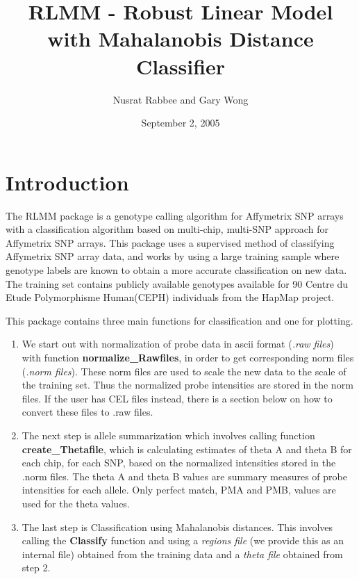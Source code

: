 \documentclass[12pt]{article}
\author{Nusrat Rabbee and Gary Wong}
\begin{document}
\title{RLMM - Robust Linear Model with Mahalanobis Distance Classifier}
\date{September 2, 2005}

\maketitle
\tableofcontents

\section{Introduction}
\noindent  
The RLMM package is a genotype calling algorithm for Affymetrix SNP arrays with a classification algorithm based on multi-chip,
multi-SNP approach for Affymetrix SNP arrays. This package uses a supervised method of classifying Affymetrix SNP array data, 
and works by using a large training sample where genotype labels are known to obtain a more accurate classification on new data.
The training set contains publicly available genotypes available for 90 Centre du Etude Polymorphisme Human(CEPH) individuals from 
the HapMap project. 

\medskip
This package contains three main functions for classification and one for plotting. 

\begin{enumerate}
\item We start out with normalization of probe data in ascii format ({\it .raw files}) with function {\bf normalize\_Rawfiles}, 
in order to get corresponding norm files ({\it .norm files}). These norm files are used to scale the new data to the scale of the training set.
Thus the normalized probe intensities are stored in the norm files. If the user has CEL files instead, there is a section below on how to
convert these files to .raw files. 

\item The next step is allele summarization which involves calling function {\bf create\_Thetafile}, which is calculating estimates of
theta A and theta B for each chip, for each SNP, based on the normalized intensities stored in the .norm files. The theta A and
theta B values are summary measures of probe intensities for each allele. Only perfect match, PMA and PMB, values are used for
the theta values.

\item The last step is Classification using Mahalanobis distances. This involves calling the {\bf Classify} function and using a
{\it regions file} (we provide this as an internal file) obtained from the training data and a {\it theta file} obtained from step 2.
\end{enumerate}
\end{document}
